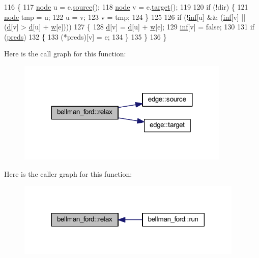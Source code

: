 \begin{DoxyCode}
116 \{
117     \mbox{\hyperlink{classnode}{node}} u = e.\mbox{\hyperlink{classedge_ae82d5701f7e6f71edc3c8b0e34bcd2b7}{source}}();
118     \mbox{\hyperlink{classnode}{node}} v = e.\mbox{\hyperlink{classedge_a97563b611261478ee19c6ce055f1a3ee}{target}}();
119 
120     \textcolor{keywordflow}{if} (!dir) \{
121         \mbox{\hyperlink{classnode}{node}} tmp = u;
122         u = v;
123         v = tmp;
124     \}        
125     
126     \textcolor{keywordflow}{if} (!\mbox{\hyperlink{classbellman__ford_a5c69a3ac59077a7a7e4b0484e5f85a32}{inf}}[u] && (\mbox{\hyperlink{classbellman__ford_a5c69a3ac59077a7a7e4b0484e5f85a32}{inf}}[v] || (\mbox{\hyperlink{classbellman__ford_a0e3b99854a3f998f8ef6cde6fb902040}{d}}[v] > \mbox{\hyperlink{classbellman__ford_a0e3b99854a3f998f8ef6cde6fb902040}{d}}[u] + \mbox{\hyperlink{classbellman__ford_ae05c9a40c2257f1e1f333b6a4f6fa656}{w}}[e]))) 
127     \{
128     \mbox{\hyperlink{classbellman__ford_a0e3b99854a3f998f8ef6cde6fb902040}{d}}[v] = \mbox{\hyperlink{classbellman__ford_a0e3b99854a3f998f8ef6cde6fb902040}{d}}[u] + \mbox{\hyperlink{classbellman__ford_ae05c9a40c2257f1e1f333b6a4f6fa656}{w}}[e];
129     \mbox{\hyperlink{classbellman__ford_a5c69a3ac59077a7a7e4b0484e5f85a32}{inf}}[v] = \textcolor{keyword}{false};
130     
131     \textcolor{keywordflow}{if} (\mbox{\hyperlink{classbellman__ford_a1ce37529c697ec5b89e8dc09204e4f59}{preds}}) 
132     \{
133         (*preds)[v] = e;
134     \} 
135     \}
136 \}
\end{DoxyCode}
Here is the call graph for this function\+:\nopagebreak
\begin{figure}[H]
\begin{center}
\leavevmode
\includegraphics[width=287pt]{classbellman__ford_a7beb9204dc5bc65ed880a044a5aad81b_cgraph}
\end{center}
\end{figure}
Here is the caller graph for this function\+:\nopagebreak
\begin{figure}[H]
\begin{center}
\leavevmode
\includegraphics[width=305pt]{classbellman__ford_a7beb9204dc5bc65ed880a044a5aad81b_icgraph}
\end{center}
\end{figure}
